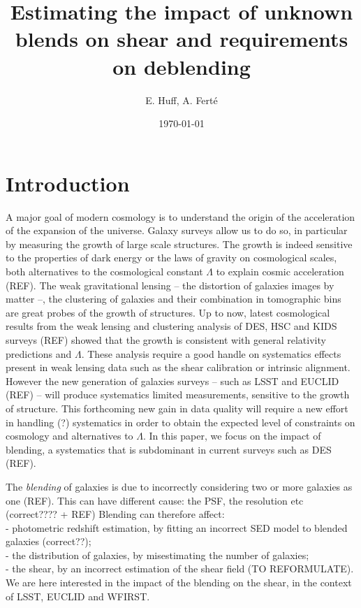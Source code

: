 \documentclass[prd,amsmath,aps,floats,amssymb, floatfix, superscriptaddress,nofootinbib,preprintnumbers,twocolumn]{article}  %
\title{Estimating the impact of unknown blends on shear and requirements on deblending}
\date{\today}
\author{E. Huff, A. Fert\'e}
\begin{document}
\maketitle



\section{Introduction}
\label{sec:intro}

A major goal of modern cosmology is to understand the origin of the acceleration of the expansion of the universe.
Galaxy surveys allow us to do so, in particular by measuring the growth of large scale structures.
The growth is indeed sensitive to the properties of dark energy or the laws of gravity on cosmological scales, both alternatives to the cosmological constant $\Lambda$ to explain cosmic acceleration (REF).   
The weak gravitational lensing -- the distortion of galaxies images by matter --, the clustering of galaxies and their combination in tomographic bins are great probes of the growth of structures.
Up to now, latest cosmological results from the weak lensing and clustering analysis of DES, HSC and KIDS surveys (REF) showed that the growth is consistent with general relativity predictions and $\Lambda$. 
These analysis require a good handle on systematics effects present in weak lensing data such as the shear calibration or intrinsic alignment.
However the new generation of galaxies surveys -- such as LSST and EUCLID (REF) -- will produce systematics limited measurements, sensitive to the growth of structure.
This forthcoming new gain in data quality will require a new effort in handling (?) systematics in order to obtain the expected level of constraints on cosmology and alternatives to $\Lambda$. 
In this paper, we focus on the impact of blending, a systematics that is subdominant in current surveys such as DES (REF).

The \textit{blending} of galaxies is due to incorrectly considering two or more galaxies as one (REF). 
This can have different cause: the PSF, the resolution etc (correct???? + REF)
Blending can therefore affect: \\
- photometric redshift estimation, by fitting an incorrect SED model to blended galaxies (correct??);\\
- the distribution of galaxies, by misestimating the number of galaxies;\\
- the shear, by an incorrect estimation of the shear field (TO REFORMULATE). \\
We are here interested in the impact of the blending on the shear, in the context of LSST, EUCLID and WFIRST. 
 
\end{document}
